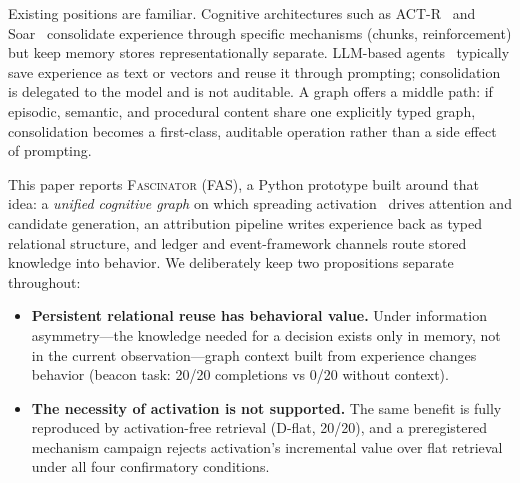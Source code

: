 \documentclass[10pt,a4paper]{article}
\begin{document}
Existing positions are familiar. Cognitive architectures such as ACT-R~\citep{anderson2004integrated} and Soar~\citep{laird2012soar} consolidate experience through specific mechanisms (chunks, reinforcement) but keep memory stores representationally separate. LLM-based agents~\citep{yao2023react,park2023generative,shinn2023reflexion} typically save experience as text or vectors and reuse it through prompting; consolidation is delegated to the model and is not auditable. A graph offers a middle path: if episodic, semantic, and procedural content share one explicitly typed graph, consolidation becomes a first-class, auditable operation rather than a side effect of prompting.

This paper reports \textsc{Fascinator} (FAS), a Python prototype built around that idea: a \emph{unified cognitive graph} on which spreading activation~\citep{collins1975spreading} drives attention and candidate generation, an attribution pipeline writes experience back as typed relational structure, and ledger and event-framework channels route stored knowledge into behavior. We deliberately keep two propositions separate throughout:

\begin{itemize}
\item[(a)] \textbf{Persistent relational reuse has behavioral value.} Under information asymmetry---the knowledge needed for a decision exists only in memory, not in the current observation---graph context built from experience changes behavior (beacon task: 20/20 completions vs 0/20 without context).
\item[(b)] \textbf{The necessity of activation is not supported.} The same benefit is fully reproduced by activation-free retrieval (D-flat, 20/20), and a preregistered mechanism campaign rejects activation's incremental value over flat retrieval under all four confirmatory conditions.
\end{itemize}
\end{document}
